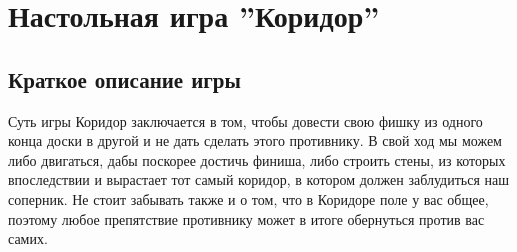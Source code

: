 \documentclass[a4paper]{article}
\begin{document}
\vfill %
\tableofcontents
\newpage

\section{Настольная игра ''Коридор''}
\subsection{Краткое описание игры}
Суть игры Коридор заключается в том, чтобы довести свою фишку из одного конца доски в другой и не дать сделать этого противнику. В свой ход мы можем либо двигаться, дабы поскорее достичь финиша, либо строить стены, из которых впоследствии и вырастает тот самый коридор, в котором должен заблудиться наш соперник. Не стоит забывать также и о том, что в Коридоре поле у вас общее, поэтому любое препятствие противнику может в итоге обернуться против вас самих.
\end{document}
